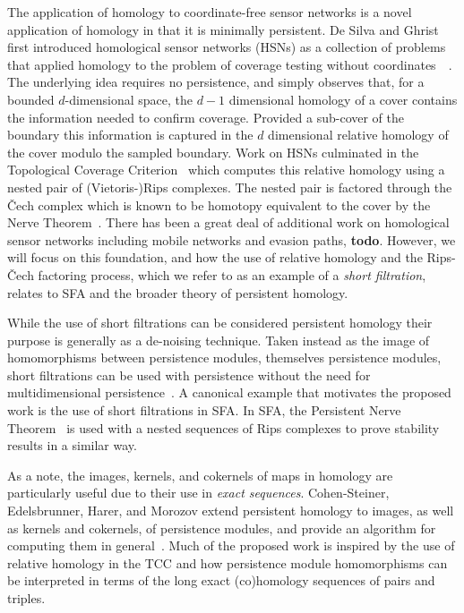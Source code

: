 The application of homology to coordinate-free sensor networks is a novel application of homology in that it is minimally persistent.
De Silva and Ghrist first introduced homological sensor networks (HSNs) as a collection of problems that applied homology to the problem of coverage testing without coordinates~~\cite{desilva06coordinate,desilva07homological}.
The underlying idea requires no persistence, and simply observes that, for a bounded $d$-dimensional space, the $d-1$ dimensional homology of a cover contains the information needed to confirm coverage.
Provided a sub-cover of the boundary this information is captured in the $d$ dimensional relative homology of the cover modulo the sampled boundary.
Work on HSNs culminated in the Topological Coverage Criterion~\cite{desilva07coverage} which computes this relative homology using a nested pair of (Vietoris-)Rips complexes.
The nested pair is factored through the \v Cech complex which is known to be homotopy equivalent to the cover by the Nerve Theorem~\cite{hatcher01}.
There has been a great deal of additional work on homological sensor networks including mobile networks and evasion paths, \textbf{todo}.
However, we will focus on this foundation, and how the use of relative homology and the Rips-\v Cech factoring process, which we refer to as an example of a \emph{short filtration}, relates to SFA and the broader theory of persistent homology.

While the use of short filtrations can be considered persistent homology their purpose is generally as a de-noising technique.
Taken instead as the image of homomorphisms between persistence modules, themselves persistence modules, short filtrations can be used with persistence without the need for multidimensional persistence~\cite{todo}.
A canonical example that motivates the proposed work is the use of short filtrations in SFA.
In SFA, the Persistent Nerve Theorem~\cite{chazal08towards} is used with a nested sequences of Rips complexes to prove stability results in a similar way.

As a note, the images, kernels, and cokernels of maps in homology are particularly useful due to their use in \emph{exact sequences}.
Cohen-Steiner, Edelsbrunner, Harer, and Morozov extend persistent homology to images, as well as kernels and cokernels, of persistence modules, and provide an algorithm for computing them in general~\cite{cohen09persistent}.
Much of the proposed work is inspired by the use of relative homology in the TCC and how persistence module homomorphisms can be interpreted in terms of the long exact (co)homology sequences of pairs and triples.

